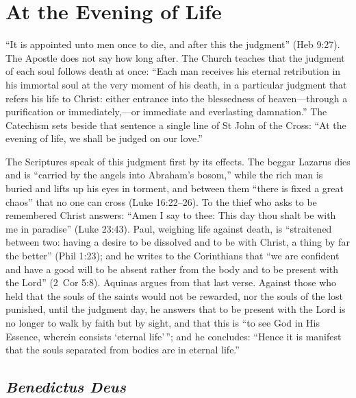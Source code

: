 \section{At the Evening of Life}\label{sec:particular}

``It is appointed unto men once to die, and after this the judgment'' (Heb 9:27). The Apostle does not say how long after. The Church teaches that the judgment of each soul follows death at once: ``Each man receives his eternal retribution in his immortal soul at the very moment of his death, in a particular judgment that refers his life to Christ: either entrance into the blessedness of heaven---through a purification or immediately,---or immediate and everlasting damnation.'' The Catechism sets beside that sentence a single line of St John of the Cross: ``At the evening of life, we shall be judged on our love.''

The Scriptures speak of this judgment first by its effects. The beggar Lazarus dies and is ``carried by the angels into Abraham's bosom,'' while the rich man is buried and lifts up his eyes in torment, and between them ``there is fixed a great chaos'' that no one can cross (Luke 16:22--26). To the thief who asks to be remembered Christ answers: ``Amen I say to thee: This day thou shalt be with me in paradise'' (Luke 23:43). Paul, weighing life against death, is ``straitened between two: having a desire to be dissolved and to be with Christ, a thing by far the better'' (Phil 1:23); and he writes to the Corinthians that ``we are confident and have a good will to be absent rather from the body and to be present with the Lord'' (2~Cor 5:8). Aquinas argues from that last verse. Against those who held that the souls of the saints would not be rewarded, nor the souls of the lost punished, until the judgment day, he answers that to be present with the Lord is no longer to walk by faith but by sight, and that this is ``to see God in His Essence, wherein consists `eternal life'\,''; and he concludes: ``Hence it is manifest that the souls separated from bodies are in eternal life.''

\subsection{\emph{Benedictus Deus}}

